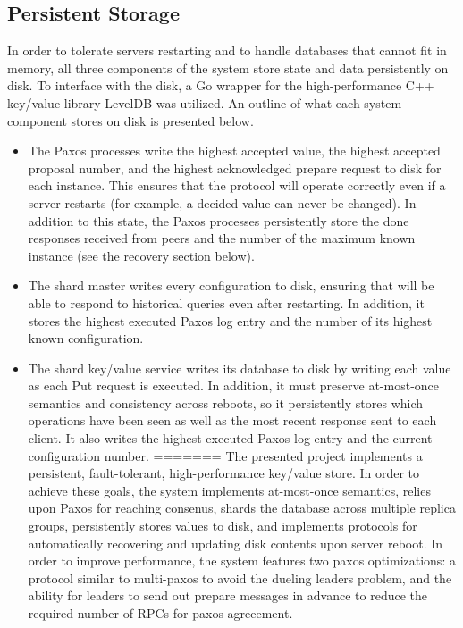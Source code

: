 \documentclass[letterpaper,10pt]{article}
\begin{document}
\subsection{Persistent Storage}
In order to tolerate servers restarting and to handle databases that cannot fit in memory, all three components of the system store state and data persistently on disk.  To interface with the disk, a Go wrapper \cite{levigo} for the high-performance C++ key/value library LevelDB \cite{leveldb} was utilized.  An outline of what each system component stores on disk is presented below.
\begin{itemize}
\item The Paxos processes write the highest accepted value, the highest accepted proposal number, and the highest acknowledged prepare request to disk for each instance.  This ensures that the protocol will operate correctly even if a server restarts \cite{paxos} (for example, a decided value can never be changed).  In addition to this state, the Paxos processes persistently store the done responses received from peers and the number of the maximum known instance (see the recovery section below).

\item The shard master writes every configuration to disk, ensuring that will be able to respond to historical queries even after restarting.  In addition, it stores the highest executed Paxos log entry and the number of its highest known configuration. 

\item The shard key/value service writes its database to disk by writing each value as each Put request is executed.  In addition, it must preserve at-most-once semantics and consistency across reboots, so it persistently stores which operations have been seen as well as the most recent response sent to each client.  It also writes the highest executed Paxos log entry and the current configuration number.
=======
The presented project implements a persistent, fault-tolerant,
high-performance key/value store. In order to achieve these goals, the
system implements at-most-once semantics, relies upon Paxos for
reaching consenus, shards the database across multiple replica groups,
persistently stores values to disk, and implements protocols for
automatically recovering and updating disk contents upon server
reboot.  In order to improve performance, the system features two
paxos optimizations: a protocol similar to multi-paxos to avoid the
dueling leaders problem, and the ability for leaders to send out
prepare messages in advance to reduce the required number of RPCs for
paxos agreeement.


\end{itemize}
\end{document}
